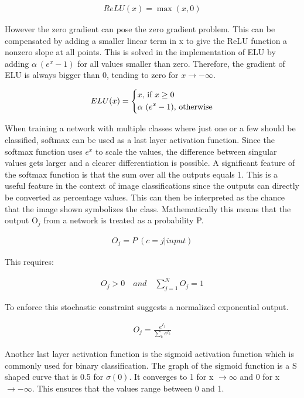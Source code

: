 \documentclass[
a4paper, 
12pt,
grayscalebody, %
abstract=on,
twoside, BCOR10mm, 12pt, DIV13,headinclude, footexclude, final, abstracton, openright
]{ibireprt}
\numberwithin{equation}{chapter}
\numberwithin{table}{chapter}
\numberwithin{figure}{chapter}
\numberwithin{algorithm}{chapter}
\numberwithin{example}{chapter}
\numberwithin{example}{chapter}
\begin{document}
\begin{align}
	ReLU(x) = \max(x,0)
\end{align}

However the zero gradient can pose the zero gradient problem. %
This can be compensated by adding a smaller linear term in x to give the ReLU function a nonzero slope at all points. This is solved in the implementation of ELU by adding $\alpha \ (e^x-1)$ for all values smaller than zero. Therefore, the gradient of ELU is always bigger than 0, tending to zero for $x \rightarrow - \infty$.


\begin{align}
	ELU(x) = 
	\begin{dcases}
		x \text{, if } x \geq 0 \\
		\alpha \ (e^x-1) \text{, otherwise}
	\end{dcases}
\end{align}

When training a network with multiple classes where just one or a few should be classified, softmax can be used as a last layer activation function. Since the softmax function uses $e^x$ to scale the values, the difference between singular values gets larger and a clearer differentiation is possible. A significant feature of the softmax function is that the sum over all the outputs equals 1. This is a useful feature in the context of image classifications since the outputs can directly be converted as percentage values. This can then be interpreted as the chance that the image shown symbolizes the class. Mathematically this means that the output O$_j$ from a network is treated as a probability P.

\begin{align}
	O_j = P \ (c= j | input)
\end{align}

This requires: 

\begin{align}
	O_j > 0 
	\quad and \quad
	\sum_{j=1}^{N} O_j = 1 
\end{align}

To enforce this stochastic constraint \cite{Bridle1990} suggests a normalized exponential output. 

\begin{align}
	O_j = \frac{e^{I_j}}{\sum_{k}^{} e^{I_k}} 	
\end{align}

Another last layer activation function is the sigmoid activation function which is commonly used for binary classification.
 The graph of the sigmoid function is a S shaped curve that is 0.5 for $\sigma(0)$. It converges to 1 for x $\rightarrow \infty$ and 0 for x $\rightarrow -\infty$. This ensures that the values range between 0 and 1. 
 
\end{document}
